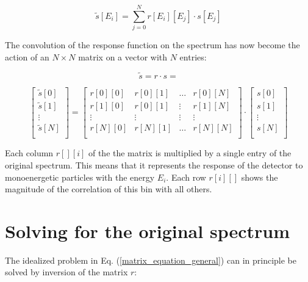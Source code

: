 \documentclass{article}
\begin{document}
\begin{equation}
	\label{convolution_discrete}
	\tilde{s}[E_i] = \sum_{j = 0}^{N} r[E_i][E_j] \cdot s[E_j]
\end{equation}

The convolution of the response function on the spectrum has now become the action of an $N \times N$ matrix on a vector with $N$ entries:

\begin{equation}
	\label{matrix_equation_general}
	\tilde{s} = r \cdot s = 
\end{equation}

\begin{equation}
	\label{matrix_equation_explicit}
	\left[ 
		\begin{array}{c}
			\tilde{s}[0] \\
			\tilde{s}[1] \\
			\vdots	\\
			\tilde{s}[N] \\
		\end{array}
	\right]
	= 
	\begin{bmatrix}
		r[0][0] & r[0][1] & \hdots & r[0][N] \\
		r[1][0] & r[0][1] & \vdots & r[1][N] \\
		\vdots  & \vdots  & \vdots & \vdots  \\
		r[N][0] & r[N][1] & \hdots & r[N][N] \\
	\end{bmatrix}
	\cdot
	\left[ 
		\begin{array}{c}
			s[0] \\
			s[1] \\
			\vdots	\\
			s[N] \\
		\end{array}
	\right]
\end{equation}

Each column $r[][i]$ of the the matrix is multiplied by a single entry of the original spectrum. This means that it represents the response of the detector to monoenergetic particles with the energy $E_i$.
Each row $r[i][]$ shows the magnitude of the correlation of this bin with all others.

\section{Solving for the original spectrum}

The idealized problem in Eq. (\ref{matrix_equation_general}) can in principle be solved by inversion of the matrix $r$:
\end{document}
